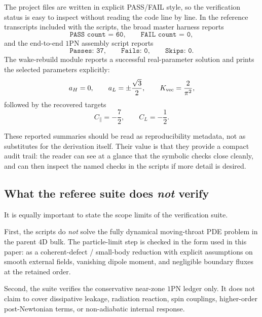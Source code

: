 \documentclass[11pt]{article}
\begin{document}
The project files are written in explicit PASS/FAIL style, so the verification status is
easy to inspect without reading the code line by line. In the reference transcripts
included with the scripts, the broad master harness reports
\begin{equation}
\texttt{PASS count = 60},
\qquad
\texttt{FAIL count = 0},
\label{eq:verification-master-count}
\end{equation}
and the end-to-end \(1\)PN assembly script reports
\begin{equation}
\texttt{Passes: 37},
\qquad
\texttt{Fails: 0},
\qquad
\texttt{Skips: 0}.
\label{eq:verification-assembly-count}
\end{equation}
The wake-rebuild module reports a successful real-parameter solution and prints the selected
parameters explicitly:
\begin{equation}
a_H=0,
\qquad
a_L=\pm\frac{\sqrt3}{2},
\qquad
K_{\rm vec}=\frac{2}{\pi^2},
\label{eq:verification-wake-output}
\end{equation}
followed by the recovered targets
\begin{equation}
C_\parallel=-\frac72,
\qquad
C_L=-\frac12.
\label{eq:verification-wake-targets}
\end{equation}

These reported summaries should be read as reproducibility metadata, not as substitutes for
the derivation itself. Their value is that they provide a compact audit trail: the reader
can see at a glance that the symbolic checks close cleanly, and can then inspect the named
checks in the scripts if more detail is desired.

\subsection{What the referee suite does \emph{not} verify}
\label{sec:verification-scope}

It is equally important to state the scope limits of the verification suite.

First, the scripts do \emph{not} solve the fully dynamical moving-throat PDE problem in the
parent \(4\)D bulk. The particle-limit step is checked in the form used in this paper:
as a coherent-defect / small-body reduction with explicit assumptions on smooth external
fields, vanishing dipole moment, and negligible boundary fluxes at the retained order.

Second, the suite verifies the conservative near-zone \(1\)PN ledger only. It does not
claim to cover dissipative leakage, radiation reaction, spin couplings, higher-order
post-Newtonian terms, or non-adiabatic internal response.
\end{document}
